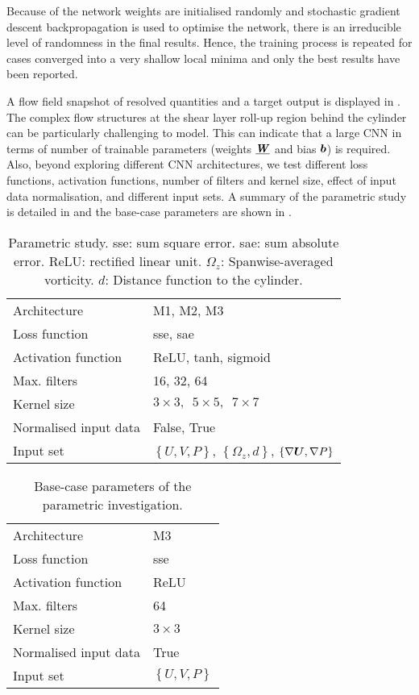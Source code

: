 \documentclass[../main.tex]{subfiles}
\begin{document}
Because of the network weights are initialised randomly and stochastic gradient descent backpropagation is used to optimise the network, there is an irreducible level of randomness in the final results.
Hence, the training process is repeated for cases converged into a very shallow local minima and only the best results have been reported.

A flow field snapshot of resolved quantities and a target output is displayed in .
The complex flow structures at the shear layer roll-up region behind the cylinder can be particularly challenging to model.
This can indicate that a large CNN in terms of number of trainable parameters (weights $\underline{\bm{\mathit{W}}}$ and bias $\boldsymbol{b}$) is required.
Also, beyond exploring different CNN architectures, we test different loss functions, activation functions, number of filters and kernel size, effect of input data normalisation, and different input sets.
A summary of the parametric study is detailed in  and the base-case parameters are shown in .

\begin{table}
\begin{center}
\begin{tabular}{ll}
\toprule
Architecture & M1, M2, M3\\
Loss function & sse, sae \\
Activation function & ReLU, tanh, sigmoid \\
Max. filters & 16, 32, 64 \\
Kernel size & $3\times3, \,\,\, 5\times5, \,\,\,7\times7$ \\
Normalised input data & False, True \\
Input set & $\left\lbrace U, V, P \right\rbrace$, $\left\lbrace \Omega_z, d \right\rbrace$,  $\left\lbrace \nabla\boldsymbol{U}, \nabla P \right\rbrace$ \\
\bottomrule
\end{tabular}
\end{center}
\caption{Parametric study.
sse: sum square error.
sae: sum absolute error.
ReLU: rectified linear unit.
$\Omega_z$: Spanwise-averaged vorticity.
$d$: Distance function to the cylinder.}
\label{tab:parameters}
\end{table} 

\begin{table}
\begin{center}
\begin{tabular}{ll}
\toprule
Architecture & M3 \\
Loss function & sse \\
Activation function & ReLU \\
Max. filters & 64 \\
Kernel size & $3\times3$ \\
Normalised input data & True \\
Input set & $\left\lbrace U, V, P \right\rbrace$ \\
\bottomrule
\end{tabular}
\end{center}
\caption{Base-case parameters of the parametric investigation.}
\label{tab:models_fixed_parameters}
\end{table}
\end{document}

